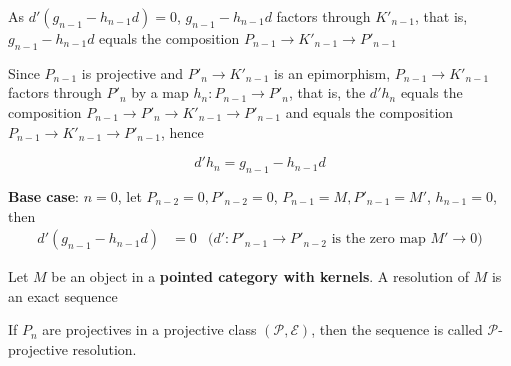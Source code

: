 \documentclass{article}
\begin{document}
\begin{longproof}
\begin{enumerate}
        \begin{center}
        \end{center}

        As $d'(g_{n-1} - h_{n-1} d) = 0$, $g_{n-1} - h_{n-1} d$ factors through $K'_{n-1}$, that is, $g_{n-1} - h_{n-1} d$ equals the composition $P_{n-1} \to K'_{n-1} \to P'_{n-1}$

        Since $P_{n-1}$ is projective and $P'_n \to K'_{n-1}$ is an epimorphism, $P_{n-1} \to K'_{n-1}$ factors through $P'_n$ by a map $h_n: P_{n-1} \to P'_n$, that is, the $d' h_n$ equals the composition $P_{n-1} \to P'_n \to K'_{n-1} \to P'_{n-1}$ and equals the composition $P_{n-1} \to K'_{n-1} \to P'_{n-1}$, hence

        $$
            d' h_n = g_{n-1} - h_{n-1} d
        $$

        \textbf{Base case}: $n=0$, let $P_{n-2} = 0, P'_{n-2} = 0$, $P_{n-1} = M, P'_{n-1} = M'$, $h_{n-1} = 0$, then 
        \begin{align*}
            d'(g_{n-1} - h_{n-1} d) 
            &= 0 &\text{($d': P'_{n-1} \to P'_{n-2}$ is the zero map $M' \to 0$)}
        \end{align*}
        
    \end{enumerate}
\end{longproof}

\begin{definition}
    Let $M$ be an object in a \textbf{pointed category with kernels}. A resolution of $M$ is an exact sequence
    \begin{center}
    \end{center}

    If $P_n$ are projectives in a projective class $(\mathcal{P}, \mathcal{E})$, then the sequence is called $\mathcal{P}$-projective resolution.
\end{definition}
\end{document}
